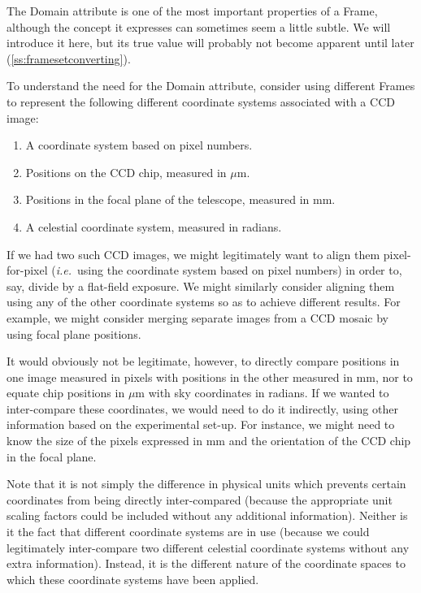 \documentclass[twoside,11pt]{article}
\newcommand{\htmlref}[2]{#1}
\newcommand{\secref}[1]{\S\ref{#1}}
\renewcommand{\secref}[1]{\ref{#1}}
\begin{document}
The \htmlref{Domain}{Domain} attribute is one of the most important properties of a
\htmlref{Frame}{Frame}, although the concept it expresses can sometimes seem a little
subtle.  We will introduce it here, but its true value will probably
not become apparent until later (\secref{ss:framesetconverting}).

To understand the need for the Domain attribute, consider using
different Frames to represent the following different coordinate
systems associated with a CCD image:

\begin{enumerate}
\item A coordinate system based on pixel numbers.

\item Positions on the CCD chip, measured in $\mu$m.

\item Positions in the focal plane of the telescope, measured in mm.

\item A celestial coordinate system, measured in radians.
\end{enumerate}

If we had two such CCD images, we might legitimately want to align
them pixel-for-pixel ({\em{i.e.}}\ using the coordinate system based
on pixel numbers) in order to, say, divide by a flat-field exposure.
We might similarly consider aligning them using any of the other
coordinate systems so as to achieve different results. For example, we
might consider merging separate images from a CCD mosaic by using
focal plane positions.

It would obviously not be legitimate, however, to directly compare
positions in one image measured in pixels with positions in the other
measured in mm, nor to equate chip positions in $\mu$m with sky
coordinates in radians. If we wanted to inter-compare these
coordinates, we would need to do it indirectly, using other
information based on the experimental set-up. For instance, we might
need to know the size of the pixels expressed in mm and the
orientation of the CCD chip in the focal plane.

Note that it is not simply the difference in physical units which
prevents certain coordinates from being directly inter-compared
(because the appropriate unit scaling factors could be included
without any additional information). Neither is it the fact that
different coordinate systems are in use (because we could legitimately
inter-compare two different celestial coordinate systems without any
extra information).  Instead, it is the different nature of the
coordinate spaces to which these coordinate systems have been applied.
\end{document}
